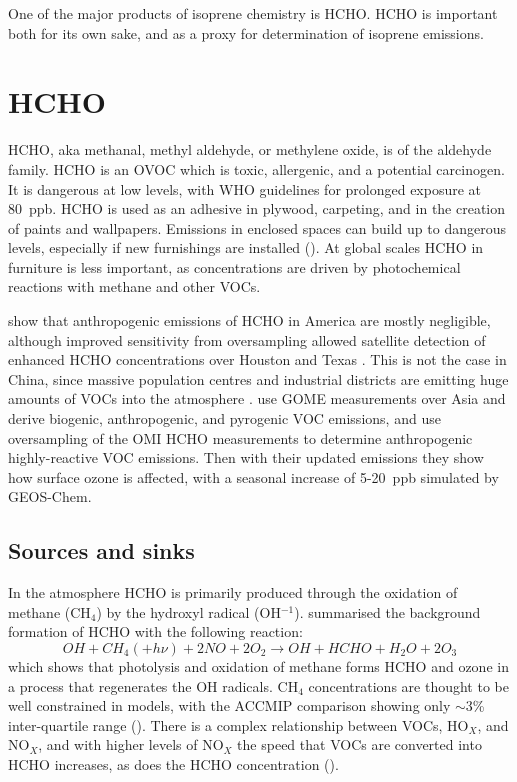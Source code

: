         
    One of the major products of isoprene chemistry is HCHO.
    HCHO is important both for its own sake, and as a proxy for determination of isoprene emissions.
    
\section{HCHO}
\label{LR:HCHO}
  HCHO, aka methanal, methyl aldehyde, or methylene oxide, is of the aldehyde family.
  HCHO is an OVOC which is toxic, allergenic, and a potential carcinogen. 
  It is dangerous at low levels, with WHO guidelines for prolonged exposure at 80~ppb.
  HCHO is used as an adhesive in plywood, carpeting, and in the creation of paints and wallpapers.
  Emissions in enclosed spaces can build up to dangerous levels, especially if new furnishings are installed (\cite{Davenport2015}).
  At global scales HCHO in furniture is less important, as concentrations are driven by photochemical reactions with methane and other VOCs.
  
  \cite{Millet2008} show that anthropogenic emissions of HCHO in America are mostly negligible, although improved sensitivity from oversampling allowed satellite detection of enhanced HCHO concentrations over Houston and Texas \citep{Zhu2014}.
  This is not the case in China, since massive population centres and industrial districts are emitting huge amounts of VOCs into the atmosphere \citep{Fu2007}.
  \cite{Fu2007} use GOME measurements over Asia and derive biogenic, anthropogenic, and pyrogenic VOC emissions, and \cite{Zhu2014} use oversampling of the OMI HCHO measurements to determine anthropogenic highly-reactive VOC emissions.
  Then with their updated emissions they show how surface ozone is affected, with a seasonal increase of 5-20~ppb simulated by GEOS-Chem.
  
  \subsection{Sources and sinks}
    \label{LR:HCHO:Sources}
     
    In the atmosphere HCHO is primarily produced through the oxidation of methane (CH$_4$) by the hydroxyl radical (OH$^{-1}$).
    \cite{Atkinson2000} summarised the background formation of HCHO with the following reaction:
    \begin{equation*} \label{LR:HCHO:Sources:eqn_MethaneBackground}
      OH + CH_4 (+ h\nu) + 2NO + 2O_2 \rightarrow OH + HCHO + H_2O + 2O_3
    \end{equation*}
    which shows that photolysis and oxidation of methane forms HCHO and ozone in a process that regenerates the OH radicals.
    CH$_4$ concentrations are thought to be well constrained in models, with the ACCMIP comparison showing only $\sim3$\% inter-quartile range (\cite{Young2013}).
    There is a complex relationship between VOCs, HO$_X$, and NO$_X$, and with higher levels of NO$_X$ the speed that VOCs are converted into HCHO increases, as does the HCHO concentration (\cite{Wolfe2016}).
    
